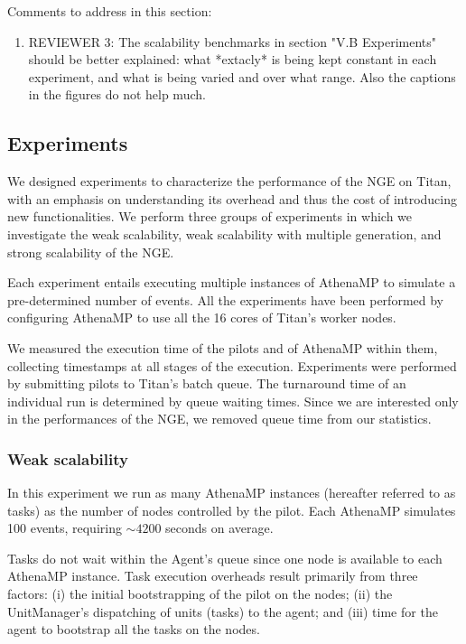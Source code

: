 \ifreview
Comments to address in this section:
\begin{enumerate}
    \color{red} 
    \item REVIEWER 3: The scalability benchmarks in section "V.B Experiments"
    should be better explained: what *extacly* is being kept constant in each
    experiment, and what is being varied and over what range. Also the
    captions in the figures do not help much.
\end{enumerate}
\fi

\subsection{Experiments}\label{sec:ngeExp}

We designed experiments to characterize the performance of the NGE on Titan,
with an emphasis on understanding its overhead and thus the cost of
introducing new functionalities. We perform three groups of experiments in
which we investigate the weak scalability, weak scalability with multiple
generation, and strong scalability of the NGE\@.

Each experiment entails executing multiple instances of AthenaMP to simulate
a pre-determined number of events. All the experiments have been performed by
configuring AthenaMP to use all the 16 cores of Titan's worker nodes.

We measured the execution time of the pilots and of AthenaMP within them,
collecting timestamps at all stages of the execution. Experiments were
performed by submitting pilots to Titan's batch queue. The turnaround
time of an individual run is determined by queue waiting times. Since we are
interested only in the performances of the NGE, we removed queue time from
our statistics.

\subsubsection{Weak scalability}

In this experiment we run as many AthenaMP instances (hereafter referred to
as tasks) as the number of nodes controlled by the pilot. Each AthenaMP
simulates 100 events, requiring \(\sim 4200\) seconds on average.

Tasks do not wait within the Agent's queue since one node is available to
each AthenaMP instance. Task execution  overheads result primarily from
three factors: (i) the initial bootstrapping of the pilot on the nodes; (ii)
the UnitManager's dispatching of units (tasks) to the agent; and (iii) time
for the agent to bootstrap all the tasks on the nodes.

